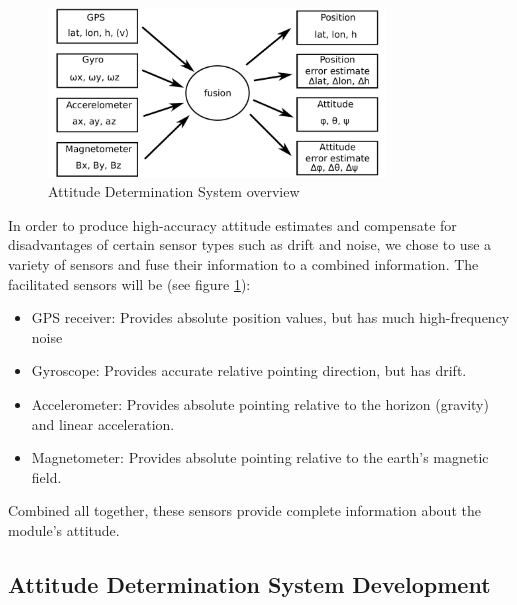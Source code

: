 \begin{figure}
\centering
\includegraphics[width=0.8\textwidth]{figures/ADS_diagram.pdf}
\caption{Attitude Determination System overview}
\label{fig:ADS_overview}
\end{figure}

\pagebreak

\noindent
In order to produce high-accuracy attitude estimates and compensate for disadvantages of certain sensor types such as drift and noise, we chose to use a variety of sensors and fuse their information to a combined information.
The facilitated sensors will be (see figure \ref{fig:ADS_overview}):
\begin{itemize}
\item GPS receiver: Provides absolute position values, but has much high-frequency noise
\item Gyroscope: Provides accurate relative pointing direction, but has drift.
\item Accelerometer: Provides absolute pointing relative to the horizon (gravity) and linear acceleration.
\item Magnetometer: Provides absolute pointing relative to the earth's magnetic field.
\end{itemize}

\noindent
Combined all together, these sensors provide complete information about the module's attitude.

\subsection{Attitude Determination System Development}

